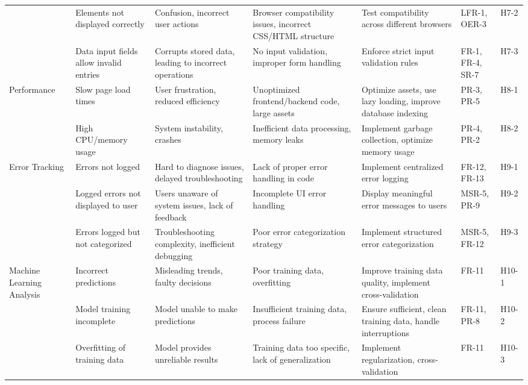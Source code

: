 \documentclass{article}
\begin{document}
\begin{landscape}
\begin{longtable}{|p{2.5cm}|p{4cm}|p{4cm}|p{4cm}|p{4cm}|p{1.25cm}|p{1cm}|}
      \cline{2-7}
      \texttt{} & Elements not displayed correctly & Confusion, incorrect user
      actions & Browser compatibility issues, incorrect CSS/HTML structure &
      Test compatibility across different browsers & LFR-1, OER-3 & H7-2 \\
      \cline{2-7}
      \texttt{} & Data input fields allow invalid entries & Corrupts stored
      data, leading to incorrect operations & No input validation, improper form
      handling & Enforce strict input validation rules & FR-1, FR-4, SR-7 & H7-3
      \\
      \cline{1-7}
      Performance & Slow page load times & User frustration, reduced efficiency
      & Unoptimized frontend/backend code, large assets & Optimize assets, use
      lazy loading, improve database indexing & PR-3, PR-5 & H8-1 \\
      \cline{2-7}
      \texttt{} & High CPU/memory usage & System instability, crashes &
      Inefficient data processing, memory leaks & Implement garbage collection,
      optimize memory usage & PR-4, PR-2 & H8-2 \\
      \cline{1-7}
      Error Tracking & Errors not logged & Hard to diagnose issues, delayed
      troubleshooting & Lack of proper error handling in code & Implement
      centralized error logging & FR-12, FR-13 & H9-1 \\
      \cline{2-7}
      \texttt{} & Logged errors not displayed to user & Users unaware of system
      issues, lack of feedback & Incomplete UI error handling & Display
      meaningful error messages to users & MSR-5, PR-9 & H9-2 \\
      \cline{2-7}
      \texttt{} & Errors logged but not categorized & Troubleshooting
      complexity, inefficient debugging & Poor error categorization strategy &
      Implement structured error categorization & MSR-5, FR-12 & H9-3 \\
      \cline{1-7}
      Machine Learning Analysis & Incorrect predictions & Misleading trends,
      faulty decisions & Poor training data, overfitting & Improve training data
      quality, implement cross-validation & FR-11 & H10-1 \\
      \cline{2-7}
      \texttt{} & Model training incomplete & Model unable to make predictions &
      Insufficient training data, process failure & Ensure sufficient, clean
      training data, handle interruptions & FR-11, PR-8 & H10-2 \\
      \cline{2-7}
      \texttt{} & Overfitting of training data & Model provides unreliable
      results & Training data too specific, lack of generalization & Implement
      regularization, cross-validation & FR-11 & H10-3 \\
      \cline{1-7}
  \end{longtable}
\end{landscape}
\end{document}
